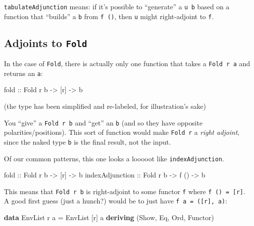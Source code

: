 \documentclass[]{article}
\newenvironment{Shaded}{}{}
\newcommand{\DataTypeTok}[1]{\textcolor[rgb]{0.56,0.13,0.00}{#1}}
\newcommand{\KeywordTok}[1]{\textcolor[rgb]{0.00,0.44,0.13}{\textbf{#1}}}
\newcommand{\NormalTok}[1]{#1}
\newcommand{\OtherTok}[1]{\textcolor[rgb]{0.00,0.44,0.13}{#1}}
\begin{document}
\texttt{tabulateAdjunction} means: if it's possible to ``generate'' a
\texttt{u\ b} based on a function that ``builds'' a \texttt{b} from
\texttt{f\ ()}, then \texttt{u} might right-adjoint to \texttt{f}.

\hypertarget{adjoints-to-fold}{%
\subsection{\texorpdfstring{Adjoints to
\texttt{Fold}}{Adjoints to Fold}}\label{adjoints-to-fold}}

In the case of \texttt{Fold}, there is actually only one function that takes a
\texttt{Fold\ r\ a} and returns an \texttt{a}:

\begin{Shaded}
\begin{Highlighting}[]
\OtherTok{fold ::} \DataTypeTok{Fold}\NormalTok{ r b }\OtherTok{{-}>}\NormalTok{ [r] }\OtherTok{{-}>}\NormalTok{ b}
\end{Highlighting}
\end{Shaded}

(the type has been simplified and re-labeled, for illustration's sake)

You ``give'' a \texttt{Fold\ r\ b} and ``get'' an \texttt{b} (and so they have
opposite polarities/positions). This sort of function would make
\texttt{Fold\ r} a \emph{right adjoint}, since the naked type \texttt{b} is the
final result, not the input.

Of our common patterns, this one looks a looooot like \texttt{indexAdjunction}.

\begin{Shaded}
\begin{Highlighting}[]
\OtherTok{fold            ::} \DataTypeTok{Fold}\NormalTok{ r b }\OtherTok{{-}>}\NormalTok{ [r]  }\OtherTok{{-}>}\NormalTok{ b}
\OtherTok{indexAdjunction ::} \DataTypeTok{Fold}\NormalTok{ r b }\OtherTok{{-}>}\NormalTok{ f () }\OtherTok{{-}>}\NormalTok{ b}
\end{Highlighting}
\end{Shaded}

This means that \texttt{Fold\ r\ b} is right-adjoint to some functor \texttt{f}
where \texttt{f\ ()\ =\ {[}r{]}}. A good first guess (just a hunch?) would be to
just have \texttt{f\ a\ =\ ({[}r{]},\ a)}:

\begin{Shaded}
\begin{Highlighting}[]
\KeywordTok{data} \DataTypeTok{EnvList}\NormalTok{ r a }\OtherTok{=} \DataTypeTok{EnvList}\NormalTok{ [r] a}
  \KeywordTok{deriving}\NormalTok{ (}\DataTypeTok{Show}\NormalTok{, }\DataTypeTok{Eq}\NormalTok{, }\DataTypeTok{Ord}\NormalTok{, }\DataTypeTok{Functor}\NormalTok{)}
\end{Highlighting}
\end{Shaded}
\end{document}
